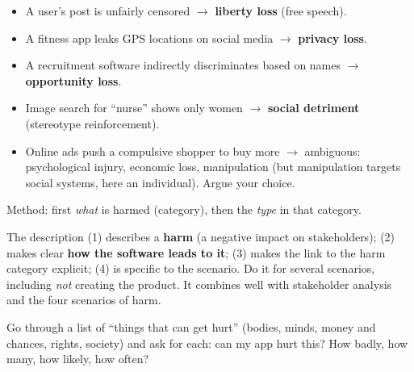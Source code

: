 \documentclass[11pt,a4paper,openany]{book}
\begin{document}
\begin{exbox}[title={Review questions: which harm?}]
\begin{itemize}
  \item A user's post is unfairly censored $\to$ \textbf{liberty loss} (free speech).
  \item A fitness app leaks GPS locations on social media $\to$ \textbf{privacy loss}.
  \item A recruitment software indirectly discriminates based on names $\to$
        \textbf{opportunity loss}.
  \item Image search for ``nurse'' shows only women $\to$ \textbf{social detriment}
        (stereotype reinforcement).
  \item Online ads push a compulsive shopper to buy more $\to$ ambiguous: psychological injury,
        economic loss, manipulation (but manipulation targets social systems, here an
        individual). Argue your choice.
\end{itemize}
Method: first \emph{what} is harmed (category), then the \emph{type} in that category.
\end{exbox}

\begin{keybox}[title={How the case studies are graded}]
The description (1) describes a \textbf{harm} (a negative impact on stakeholders); (2) makes
clear \textbf{how the software leads to it}; (3) makes the link to the harm category explicit;
(4) is specific to the scenario. Do it for several scenarios, including \emph{not} creating the
product. It combines well with stakeholder analysis and the four scenarios of harm.
\end{keybox}

\begin{goatbox}
Go through a list of ``things that can get hurt'' (bodies, minds, money and chances, rights,
society) and ask for each: can my app hurt this? How badly, how many, how likely, how often?
\end{goatbox}
\end{document}
